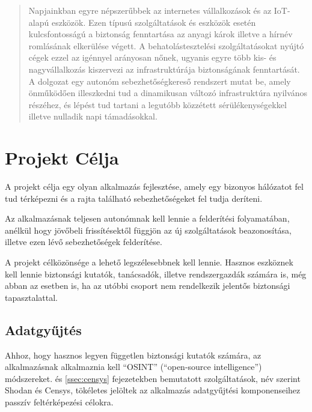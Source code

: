 \documentclass[a4paper,12pt]{article}
\begin{document}
	\begingroup
	\hypersetup{linkcolor=lightblue}
	\listoffigures
	\listoflistings
	\endgroup

\newpage
\pagestyle{fancy}

\begin{abstract}
	Napjainkban egyre népszerűbbek az internetes vállalkozások és az IoT-alapú eszközök. Ezen típusú szolgáltatások és eszközök esetén kulcsfontosságú a biztonság fenntartása az anyagi károk illetve a hírnév romlásának elkerülése végett. A behatolástesztelési szolgáltatásokat nyújtó cégek ezzel az igénnyel arányosan nőnek, ugyanis egyre több kis- és nagyvállalkozás kiszervezi az infrastruktúrája biztonságának fenntartását. A dolgozat egy autonóm sebezhetőségkereső rendszert mutat be, amely önműködően illeszkedni tud a dinamikusan változó infrastruktúra nyilvános részéhez, és lépést tud tartani a legutóbb közzétett sérülékenységekkel illetve nulladik napi támadásokkal.
\end{abstract}

\section{Projekt Célja}

	A projekt célja egy olyan alkalmazás fejlesztése, amely egy bizonyos hálózatot fel tud térképezni és a rajta található sebezhetőségeket fel tudja deríteni.
	
	Az alkalmazásnak teljesen autonómnak kell lennie a felderítési folyamatában, anélkül hogy jövőbeli frissítésektől függjön az új szolgáltatások beazonosítása, illetve ezen lévő sebezhetőségek felderítése.

	A projekt célközönsége a lehető legszélesebbnek kell lennie. Hasznos eszköznek kell lennie biztonsági kutatók, tanácsadók, illetve rendszergazdák számára is, még abban az esetben is, ha az utóbbi csoport nem rendelkezik jelentős biztonsági tapasztalattal.

\subsection{Adatgyűjtés}

	Ahhoz, hogy hasznos legyen független biztonsági kutatók számára, az alkalmazásnak alkalmaznia kell ``OSINT'' (``open-source intelligence'') módszereket. \Az{\ref{ssec:shodan}} és \ref{ssec:censys} fejezetekben bemutatott szolgáltatások, név szerint Shodan\cite{shodan16} és Censys\cite{censys15}, tökéletes jelöltek az alkalmazás adatgyűjtési komponenseihez passzív feltérképezési célokra.
	
\end{document}
